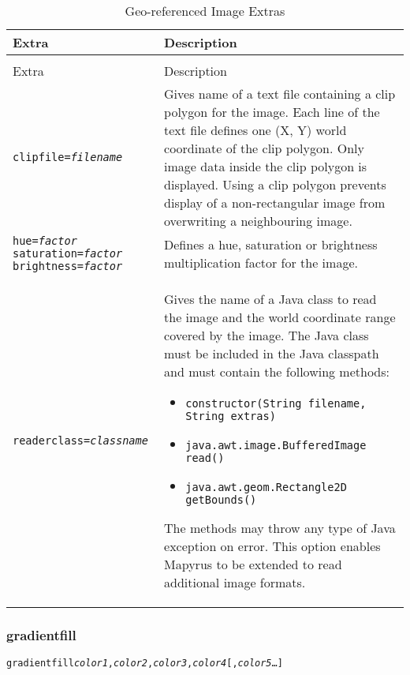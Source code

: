\begin{longtable}{|l|p{7cm}|}
\hline
\label{geoimageextras}
Extra & Description \\
\hline
\hline
\endfirsthead
\hline
\caption{Geo-referenced Image Extras} \\
\endfoot

\hline
Extra & Description \\
\hline
\hline
\endhead

\texttt{clipfile=\textit{filename}} &

Gives name of a text file containing a clip polygon for the image.
Each line of the text file defines one (X, Y) world coordinate
of the clip polygon.
Only image data inside the clip polygon is displayed.
Using a clip polygon prevents display of a non-rectangular image
from overwriting a neighbouring image. \\

\texttt{hue=\textit{factor}}
\texttt{saturation=\textit{factor}}
\texttt{brightness=\textit{factor}}
&

Defines a hue, saturation or brightness multiplication factor for the image. \\

\texttt{readerclass=\textit{classname}} &

Gives the name of a Java class to read the image and the world
coordinate range covered by the image.  The Java class must
be included in the Java classpath and must contain the following methods:
\begin{itemize}
\item
\texttt{constructor(String filename, String extras)}
\item
\texttt{java.awt.image.BufferedImage read()}
\item
\texttt{java.awt.geom.Rectangle2D getBounds()}
\end{itemize}

The methods may throw any type of Java exception on error.
This option enables Mapyrus to
be extended to read additional image formats. \\

\hline
\end{longtable}

\subsubsection{gradientfill}

\begin{alltt}
gradientfill \textit{color1}, \textit{color2}, \textit{color3}, \textit{color4} [, \textit{color5} \ldots]
\end{alltt}


